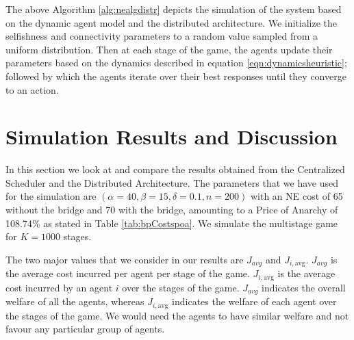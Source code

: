 \documentclass[11pt, letterpaper]{article}
\begin{document}
The above Algorithm \ref{alg:nealgdistr} depicts the simulation of the system based on the dynamic agent model and the distributed architecture. We initialize the selfishness and connectivity parameters to a random value sampled from a uniform distribution. Then at each stage of the game, the agents update their parameters based on the dynamics described in equation \ref{eqn:dynamicsheuristic}; followed by which the agents iterate over their best responses until they converge to an action.  

\section{Simulation Results and Discussion}\label{sec:results}
In this section we look at and compare the results obtained from the Centralized Scheduler and the Distributed Architecture. The parameters that we have used for the simulation are $(\alpha=40, \beta=15, \delta=0.1, n=200)$ with an NE cost of 65 without the bridge and 70 with the bridge, amounting to a Price of Anarchy of 108.74\% as stated in Table \ref{tab:bpCostspoa}. We simulate the multistage game for $K=1000$ stages. 

The two major values that we consider in our results are $J_{avg}$ and $J_{i, \text{avg}}$. $J_{avg}$ is the average cost incurred per agent per stage of the game. $J_{i, \text{avg}}$ is the average cost incurred by an agent $i$ over the stages of the game. $J_{avg}$ indicates the overall welfare of all the agents, whereas $J_{i, \text{avg}}$ indicates the welfare of each agent over the stages of the game. We would need the agents to have similar welfare and not favour any particular group of agents.
\end{document}
